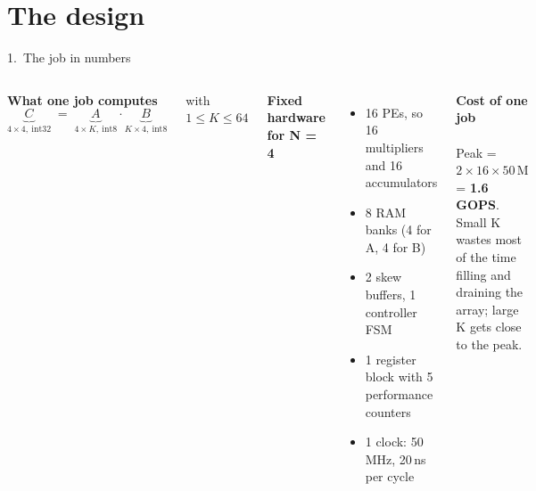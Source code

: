 \documentclass[aspectratio=169,11pt]{beamer}
\begin{document}
\section{The design}
\begin{frame}{1.\ The job in numbers}
  \begin{columns}[T]
    \small
    \textbf{What one job computes}
    \[ \underbrace{C}_{4\times4,\ \text{int32}} \;=\; \underbrace{A}_{4\times K,\ \text{int8}} \cdot \underbrace{B}_{K\times4,\ \text{int8}} \]
    \centerline{\footnotesize with $1 \le K \le 64$}
    \textbf{Fixed hardware for N = 4}
    \begin{itemize}
      \item 16 PEs, so 16 multipliers and 16 accumulators
      \item 8 RAM banks (4 for A, 4 for B)
      \item 2 skew buffers, 1 controller FSM
      \item 1 register block with 5 performance counters
      \item 1 clock: 50\,MHz, 20\,ns per cycle
    \end{itemize}
    \small
    \textbf{Cost of one job}\\[1mm]
    \\[2mm]
    Peak = $2 \times 16 \times 50\,\text{M}$ = \textbf{1.6\,GOPS}. Small K wastes most of the time filling and draining
    the array; large K gets close to the peak.
  \end{columns}
\end{frame}
\end{document}
